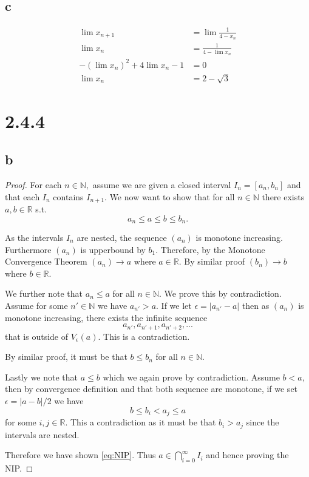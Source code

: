 \documentclass[10pt]{article}
\begin{document}
\subsection*{c}
\begin{align*}
    \lim x_{n+1} &= \lim \frac{1}{4-x_n}\\
    \lim x_n &= \frac{1}{4-\lim x_n}\\
     - (\lim x_n)^2 + 4\lim x_n - 1 &= 0\\
     \lim x_n &= 2-\sqrt{3}
\end{align*}

\section*{2.4.4}
\subsection*{b}
\begin{proof}
    For each $n\in\mathbb{N},$ assume we are given a closed interval $I_n=[a_n,b_n]$ and that each $I_n$ contains $I_{n+1}.$ We now want to show that for all $n\in\mathbb{N}$ there exists $a,b\in\mathbb{R}$ s.t. 
    \begin{equation} \label{eq:NIP}
        a_n\le a\le b\le b_n.
    \end{equation}

    As the intervals $I_n$ are nested, the sequence $(a_n)$ is monotone increasing. Furthermore $(a_n)$ is upperbound by $b_1$. Therefore, by the Monotone Convergence Theorem $(a_n)\to a$ where $a\in\mathbb{R}.$ By similar proof $(b_n)\to b$ where $b\in\mathbb{R}.$

    We further note that $a_n \le a$  for all $n\in\mathbb{N}.$ We prove this by contradiction. Assume for some $n'\in\mathbb{N}$ we have $a_{n'}> a.$ If we let $\epsilon = |a_{n'}-a|$ then as $(a_n)$ is monotone increasing, there exists the infinite sequence 
    \[a_{n'},a_{n'+1},a_{n'+2},...\]
    that is outside of $V_\epsilon(a)$. This is a contradiction.

    By similar proof, it must be that $b\le b_n$ for all $n\in\mathbb{N}.$


    Lastly we note that $a \le b$ which we again prove by contradiction. Assume $b<a,$ then by convergence definition and that both sequence are monotone, if we set $\epsilon = |a-b|/2$ we have
    \[b\le b_i<a_j\le a\]
    for some $i,j\in\mathbb{R}.$ This a contradiction as it must be that $b_i > a_j$ since the intervals are nested.

    Therefore we have shown \eqref{eq:NIP}. Thus $a\in\bigcap_{i=0}^\infty I_i$ and hence proving the NIP.
\end{proof}
\end{document}
